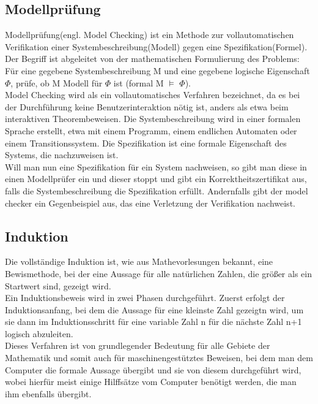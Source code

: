 \subsection{Modellprüfung}
Modellprüfung(engl. Model Checking) ist ein Methode zur vollautomatischen Verifikation einer Systembeschreibung(Modell) gegen eine Spezifikation(Formel). Der Begriff ist abgeleitet von der mathematischen Formulierung des Problems: Für eine gegebene Systembeschreibung M und eine gegebene logische Eigenschaft $\Phi$, prüfe, ob M Modell für $\Phi$ ist (formal M $\models$  $\Phi$).\\
Model Checking wird als ein vollautomatisches Verfahren bezeichnet, da es bei der Durchführung keine Benutzerinteraktion nötig ist, anders als etwa beim interaktiven Theorembeweisen. Die Systembeschreibung wird in einer formalen Sprache erstellt, etwa mit einem Programm, einem endlichen Automaten oder einem Transitionssystem. Die Spezifikation ist eine formale Eigenschaft des Systems, die nachzuweisen ist.\\
Will man nun eine Spezifikation für ein System nachweisen, so gibt man diese in einen Modellprüfer ein und dieser stoppt und gibt ein Korrektheitszertifikat aus, falls die Systembeschreibung die Spezifikation erfüllt. Andernfalls gibt  der model checker ein Gegenbeispiel aus, das eine Verletzung der Verifikation nachweist.

\subsection{Induktion}
Die vollständige Induktion ist, wie aus Mathevorlesungen bekannt, eine Bewismethode, bei der eine Aussage für alle natürlichen Zahlen, die größer als ein Startwert sind, gezeigt wird.\\
Ein Induktionsbeweis wird in zwei Phasen durchgeführt. Zuerst erfolgt der Induktionsanfang, bei dem die Aussage für eine kleinste Zahl gezeigtn wird, um sie dann im Induktionsschritt für eine variable Zahl n für die nächste Zahl n+1 logisch abzuleiten.\\
Dieses Verfahren ist von grundlegender Bedeutung für alle Gebiete der Mathematik und somit auch für maschinengestütztes Beweisen, bei dem man dem Computer die formale Aussage übergibt und sie von diesem durchgeführt wird, wobei hierfür meist einige Hilffsätze vom Computer benötigt werden, die man ihm ebenfalls übergibt.

